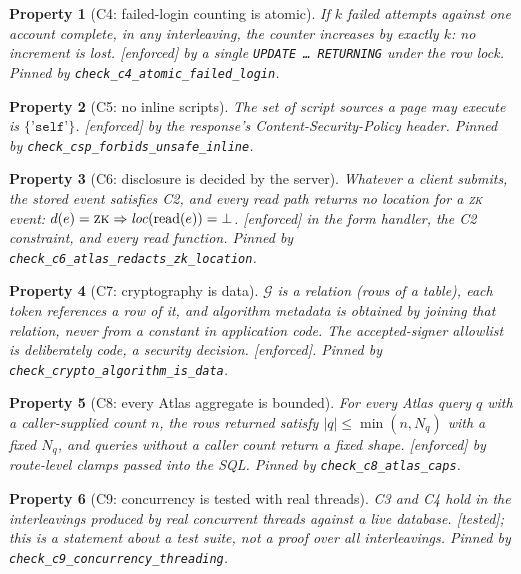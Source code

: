 \documentclass[11pt]{article}
\newtheorem{property}{Property}
\theoremstyle{remark}
\newcommand{\Alg}{\mathcal G}
\newcommand{\code}[1]{\texttt{#1}}
\newcommand{\emark}[1]{\textup{\textsf{[#1]}}}
\newcommand{\st}[1]{\textup{\textsc{#1}}}
\begin{document}
\begin{property}[C4: failed-login counting is atomic] If $k$ failed attempts against one account
complete, in any interleaving, the counter increases by exactly $k$: no increment is lost.
\emark{enforced} by a single \texttt{UPDATE \dots\ RETURNING} under the row lock. Pinned by \code{check\_c4\_atomic\_failed\_login}.
\end{property}

\begin{property}[C5: no inline scripts] The set of script sources a page may execute is
$\{\texttt{'self'}\}$. \emark{enforced} by the response's Content-Security-Policy header. Pinned by \code{check\_csp\_forbids\_unsafe\_inline}.
\end{property}

\begin{property}[C6: disclosure is decided by the server] Whatever a client submits, the stored event
satisfies C2, and every read path returns no location for a \st{zk} event:
$d(e)=\st{zk}\Rightarrow \mathit{loc}(\mathrm{read}(e))=\bot$. \emark{enforced} in the form handler,
the C2 constraint, and every read function. Pinned by \code{check\_c6\_atlas\_redacts\_zk\_location}.
\end{property}

\begin{property}[C7: cryptography is data] $\Alg$ is a relation (rows of a table), each token
references a row of it, and algorithm metadata is obtained by joining that relation, never from a
constant in application code. The accepted-signer allowlist is deliberately code, a security decision.
\emark{enforced}. Pinned by \code{check\_crypto\_algorithm\_is\_data}.
\end{property}

\begin{property}[C8: every Atlas aggregate is bounded] For every Atlas query $q$ with a caller-supplied
count $n$, the rows returned satisfy $|q|\le\min(n, N_q)$ with a fixed $N_q$, and queries without a
caller count return a fixed shape. \emark{enforced} by route-level clamps passed into the SQL. Pinned by \code{check\_c8\_atlas\_caps}.
\end{property}

\begin{property}[C9: concurrency is tested with real threads] C3 and C4 hold in the interleavings
produced by real concurrent threads against a live database. \emark{tested}; this is a statement
about a test suite, not a proof over all interleavings. Pinned by \code{check\_c9\_concurrency\_threading}.
\end{property}
\end{document}
